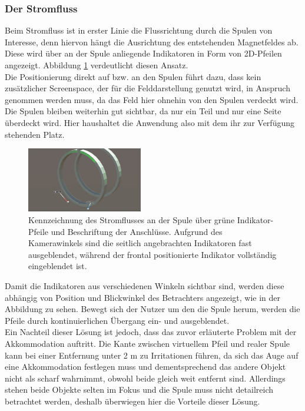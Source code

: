 \subsubsection{Der Stromfluss} 
\label{sec-4-2-3}
Beim Stromfluss ist in erster Linie die Flussrichtung durch die Spulen von Interesse, denn hiervon hängt die Ausrichtung des entstehenden Magnetfeldes ab. Diese wird über an der Spule anliegende Indikatoren in Form von 2D-Pfeilen angezeigt. Abbildung \ref{img:current} verdeutlicht diesen Ansatz.\\
\noindent\hspace*{5mm}
Die Positionierung direkt auf bzw. an den Spulen führt dazu, dass kein zusätzlicher Screenspace, der für die Felddarstellung genutzt wird, in Anspruch genommen werden muss, da das Feld hier ohnehin von den Spulen verdeckt wird. Die Spulen bleiben weiterhin gut sichtbar, da nur ein Teil und nur eine Seite überdeckt wird. Hier haushaltet die Anwendung also mit dem ihr zur Verfügung stehenden Platz.\\

\begin{figure}
	\centering
	\includegraphics[width=0.45\textwidth]{images/unity/current.jpg}
	\caption{Kennzeichnung des Stromflusses an der Spule über grüne Indikator-Pfeile und Beschriftung der Anschlüsse. Aufgrund des Kamerawinkels sind die seitlich angebrachten Indikatoren fast ausgeblendet, während der frontal positionierte Indikator vollständig eingeblendet ist.}
	\label{img:current}
\end{figure}

Damit die Indikatoren aus verschiedenen Winkeln sichtbar sind, werden diese abhängig von Position und Blickwinkel des Betrachters angezeigt, wie in der Abbildung zu sehen. Bewegt sich der Nutzer um den die Spule herum, werden die Pfeile durch kontinuierlichen Übergang ein- und ausgeblendet.\\

Ein Nachteil dieser Lösung ist jedoch, dass das zuvor erläuterte Problem mit der Akkommodation auftritt. Die Kante zwischen virtuellem Pfeil und realer Spule kann bei einer Entfernung unter 2 m zu Irritationen führen, da sich das Auge auf eine Akkommodation festlegen muss und dementsprechend das andere Objekt nicht als scharf wahrnimmt, obwohl beide gleich weit entfernt sind. Allerdings stehen beide Objekte selten im Fokus und die Spule muss nicht detailreich betrachtet werden, deshalb überwiegen hier die Vorteile dieser Lösung.\\

